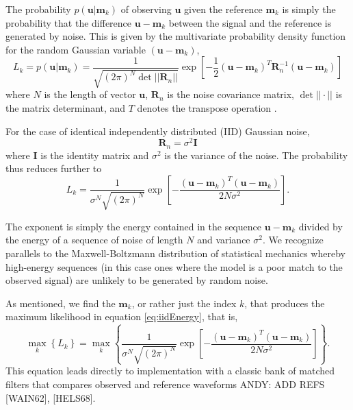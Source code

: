 The probability $p(\mathbf{u}|\mathbf{m}_k)$ of observing $\mathbf{u}$ given the reference $\mathbf{m}_k$ is simply the probability that the difference $\mathbf{u}-\mathbf{m}_k$ between the signal and the reference is generated by noise. This is given by the multivariate probability density function for the random Gaussian variable $(\mathbf{u}-\mathbf{m}_k)$, 
\begin{equation}\label{eq:Main}
L_k = p(\mathbf{u}|\mathbf{m}_k) = \frac{1}{  \sqrt{ (2\pi)^N \det || \mathbf{R}_n||} } \exp\left[ -\frac{1}{2}  (\mathbf{u}-\mathbf{m}_k)^T \mathbf{R}_n^{-1} (\mathbf{u}-\mathbf{m}_k) \right]
\end{equation}
where $N$ is the length of vector $\mathbf{u}$, $\mathbf{R}_n$ is the noise covariance matrix, $\det||{\cdot}||$ is the matrix determinant, and $T$ denotes the transpose operation  \citep{helstrom_statistical_1968, wainstein_extraction_1962}.

For the case of identical independently distributed (IID) Gaussian noise, 
\begin{equation}
\mathbf{R}_n=\sigma^2 \mathbf{I}
\end{equation}
where $\mathbf{I}$ is the identity matrix and $\sigma^2$ is the variance of the noise. The probability thus reduces further to
\begin{equation}\label{eq:iidEnergy}
L_k = \frac{1}{  \sigma^N \sqrt{ (2\pi)^N}   } \exp\left[ -\frac{(\mathbf{u}-\mathbf{m}_k)^T(\mathbf{u}-\mathbf{m}_k)} {2 N \sigma^2 } \right].
\end{equation}

The exponent is simply the energy contained in the sequence $\mathbf{u}-\mathbf{m}_k$ divided by the
energy of a sequence of noise of length $N$ and variance $\sigma^2$. We recognize parallels to the Maxwell-Boltzmann distribution of statistical mechanics \citep{reif_fundamentals_1965} whereby high-energy sequences (in this case ones where the model is a poor match to the observed signal) are unlikely to be generated by random noise.  

As mentioned, we find the $\mathbf{m}_k$, or rather just the index $k$, that produces the maximum likelihood in equation \ref{eq:iidEnergy}, that is,
\begin{equation}
\max_k   \left\{ L_k \right\} =  \max_k  \left\{ \frac{1}{   \sigma^N\sqrt{ (2\pi)^N}  } \exp\left[ -\frac{(\mathbf{u}-\mathbf{m}_k)^T(\mathbf{u}-\mathbf{m}_k)} {2 N \sigma^2 } \right] \right\}. 
\end{equation}
This equation leads directly to implementation with a classic bank of matched filters that compares observed and reference waveforms ANDY:  ADD REFS [WAIN62], [HELS68]. 

